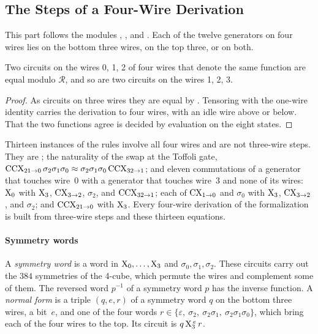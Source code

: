 \documentclass[acmsmall,screen,nonacm]{acmart}
\begin{document}
\subsection{The Steps of a Four-Wire Derivation}\label{app:xcxccx-steps}

This part follows the modules , , and . Each of the twelve generators on four wires lies on the bottom three wires, on the top three, or on both.

\begin{lemma}\label{lem:x-narrow}
Two circuits on the wires 0, 1, 2 of four wires that denote the same function are equal modulo $\mathcal{R}$, and so are two circuits on the wires 1, 2, 3.
\end{lemma}

\begin{proof}
As circuits on three wires they are equal by . Tensoring with the one-wire identity carries the derivation to four wires, with an idle wire above or below. That the two functions agree is decided by evaluation on the eight states.
\end{proof}

Thirteen instances of the rules involve all four wires and are not three-wire steps. They are ; the naturality of the swap at the Toffoli gate, $\mathrm{CCX}_{21\to0}\,\sigma_2\sigma_1\sigma_0\approx\sigma_2\sigma_1\sigma_0\,\mathrm{CCX}_{32\to1}$; and eleven commutations of a generator that touches wire~0 with a generator that touches wire~3 and none of its wires: $\mathrm{X}_0$ with $\mathrm{X}_3$, $\mathrm{CX}_{3\to2}$, $\sigma_2$, and $\mathrm{CCX}_{32\to1}$; each of $\mathrm{CX}_{1\to0}$ and $\sigma_0$ with $\mathrm{X}_3$, $\mathrm{CX}_{3\to2}$, and $\sigma_2$; and $\mathrm{CCX}_{21\to0}$ with $\mathrm{X}_3$. Every four-wire derivation of the formalization is built from three-wire steps and these thirteen equations.

\paragraph{Symmetry words} A \emph{symmetry word} is a word in $\mathrm{X}_0,\dots,\mathrm{X}_3$ and $\sigma_0,\sigma_1,\sigma_2$. These circuits carry out the $384$ symmetries of the 4-cube, which permute the wires and complement some of them. The reversed word $p^{-1}$ of a symmetry word $p$ has the inverse function. A \emph{normal form} is a triple $(q,e,r)$ of a symmetry word $q$ on the bottom three wires, a bit~$e$, and one of the four words $r\in\{\varepsilon,\ \sigma_2,\ \sigma_2\sigma_1,\ \sigma_2\sigma_1\sigma_0\}$, which bring each of the four wires to the top. Its circuit is $q\,\mathrm{X}_3^{\,e}\,r$.
\end{document}
